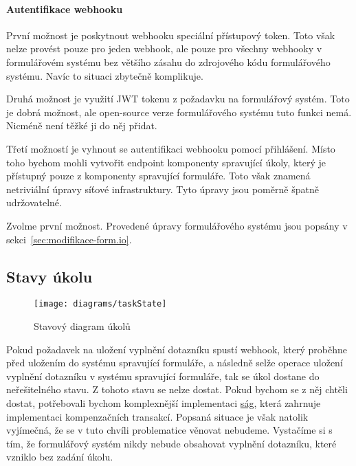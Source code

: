 \paragraph{Autentifikace webhooku}

První možnost je poskytnout webhooku speciální přístupový token.
Toto však nelze provést pouze pro jeden webhook, ale pouze pro všechny webhooky v formulářovém systému bez většího zásahu do zdrojového kódu formulářového systému.
Navíc to situaci zbytečně komplikuje.

Druhá možnost je využití JWT tokenu z požadavku na formulářový systém.
Toto je dobrá možnost, ale open-source verze formulářového systému tuto funkci nemá.
Nicméně není těžké ji do něj přidat.

Třetí možností je vyhnout se autentifikaci webhooku pomocí přihlášení.
Místo toho bychom mohli vytvořit endpoint komponenty spravující úkoly, který je přístupný pouze z komponenty spravující formuláře.
Toto však znamená netriviální úpravy síťové infrastruktury.
Tyto úpravy jsou poměrně špatně udržovatelné.


Zvolme první možnost.
Provedené úpravy formulářového systému jsou popsány v sekci~\ref{sec:modifikace-form.io}.

\subsection{Stavy úkolu}\label{subsec:stavy-ukolu}

\begin{figure}[H]
    \texttt{[image: diagrams/taskState]}
    \caption{Stavový diagram úkolů}\label{fig:task-state}
\end{figure}


Pokud požadavek na uložení vyplnění dotazníku spustí webhook, který proběhne před uložením do systému spravující formuláře, a následně selže operace uložení vyplnění dotazníku v systému spravující formuláře, tak se úkol dostane do neřešitelného stavu.
Z tohoto stavu se nelze dostat.
Pokud bychom se z něj chtěli dostat, potřebovali bychom komplexnější implementaci \href{https://microservices.io/patterns/data/saga.html}{ság}, která zahrnuje implementaci kompenzačních transakcí.
Popsaná situace je však natolik vyjímečná, že se v tuto chvíli problematice věnovat nebudeme.
Vystačíme si s tím, že formulářový systém nikdy nebude obsahovat vyplnění dotazníku, které vzniklo bez zadání úkolu.


